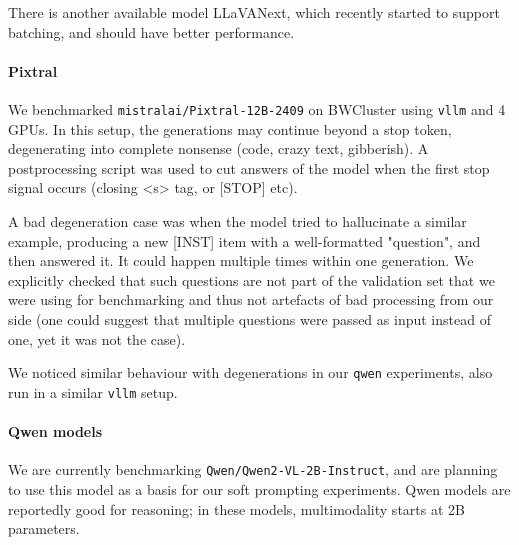 \documentclass{article}
\begin{document}
There is another available model LLaVANext, which recently started to support batching, and should have better performance. 



 


\paragraph{Pixtral}

We benchmarked \texttt{mistralai/Pixtral-12B-2409} on BWCluster using \texttt{vllm} and 4 GPUs. In this setup, the generations may continue beyond a stop token, degenerating into complete nonsense (code, crazy text, gibberish). A postprocessing script was used to cut answers of the model when the first stop signal occurs (closing <s> tag, or [STOP] etc).

A bad degeneration case was when the model tried to hallucinate a similar example, producing a new [INST] item with a well-formatted "question", and then answered it. It could happen multiple times within one generation. We explicitly checked that such questions are not part of the validation set that we were using for benchmarking and thus not artefacts of bad processing from our side (one could suggest that multiple questions were passed as input instead of one, yet it was not the case). 

We noticed similar behaviour with degenerations in our \texttt{qwen} experiments, also run in a similar \texttt{vllm} setup. 


\paragraph{Qwen models} 
We are currently benchmarking \texttt{Qwen/Qwen2-VL-2B-Instruct}, and are planning to use this model as a basis for our soft prompting experiments. Qwen models are reportedly good for reasoning; in these models, multimodality starts at 2B parameters. 
\end{document}
